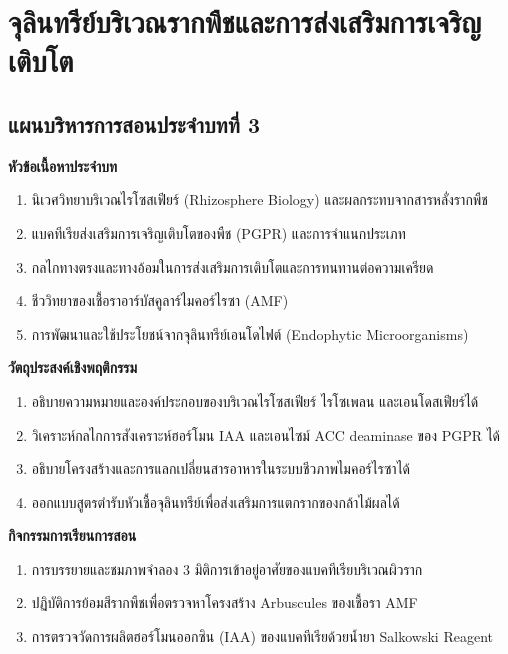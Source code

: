\chapter{จุลินทรีย์บริเวณรากพืชและการส่งเสริมการเจริญเติบโต}
\label{chap:ch03}

\section*{แผนบริหารการสอนประจำบทที่ 3}

\noindent\textbf{หัวข้อเนื้อหาประจำบท}
\begin{enumerate}
    \item นิเวศวิทยาบริเวณไรโซสเฟียร์ (Rhizosphere Biology) และผลกระทบจากสารหลั่งรากพืช
    \item แบคทีเรียส่งเสริมการเจริญเติบโตของพืช (PGPR) และการจำแนกประเภท
    \item กลไกทางตรงและทางอ้อมในการส่งเสริมการเติบโตและการทนทานต่อความเครียด
    \item ชีววิทยาของเชื้อราอาร์บัสคูลาร์ไมคอร์ไรซา (AMF)
    \item การพัฒนาและใช้ประโยชน์จากจุลินทรีย์เอนโดไฟต์ (Endophytic Microorganisms)
\end{enumerate}

\noindent\textbf{วัตถุประสงค์เชิงพฤติกรรม}
\begin{enumerate}
    \item อธิบายความหมายและองค์ประกอบของบริเวณไรโซสเฟียร์ ไรโซเพลน และเอนโดสเฟียร์ได้
    \item วิเคราะห์กลไกการสังเคราะห์ฮอร์โมน IAA และเอนไซม์ ACC deaminase ของ PGPR ได้
    \item อธิบายโครงสร้างและการแลกเปลี่ยนสารอาหารในระบบชีวภาพไมคอร์ไรซาได้
    \item ออกแบบสูตรตำรับหัวเชื้อจุลินทรีย์เพื่อส่งเสริมการแตกรากของกล้าไม้ผลได้
\end{enumerate}

\noindent\textbf{กิจกรรมการเรียนการสอน}
\begin{enumerate}
    \item การบรรยายและชมภาพจำลอง 3 มิติการเข้าอยู่อาศัยของแบคทีเรียบริเวณผิวราก
    \item ปฏิบัติการย้อมสีรากพืชเพื่อตรวจหาโครงสร้าง Arbuscules ของเชื้อรา AMF
    \item การตรวจวัดการผลิตฮอร์โมนออกซิน (IAA) ของแบคทีเรียด้วยน้ำยา Salkowski Reagent
\end{enumerate}


